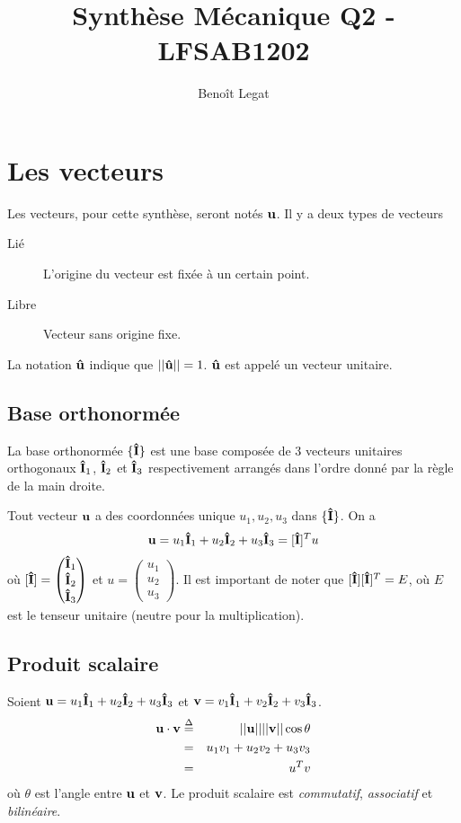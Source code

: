 \documentclass[11pt,a4paper]{article}
\title{Synthèse Mécanique Q2 - LFSAB1202}
\author{Benoît Legat}
\newcommand\fv[1]{{\bf #1}} %
\newcommand\uv[1]{{\bf\hat{ #1}}} %
\newcommand\ui{{\bf\hat{I}}} %
\newcommand\eqdef{\stackrel{\Delta}{=}}
\begin{document}
\maketitle
\section{Les vecteurs}

Les vecteurs, pour cette synthèse, seront notés $\fv{u}$.
Il y a deux types de vecteurs
\begin{description}
	\item[Lié] L'origine du vecteur est fixée à un certain point.
	\item[Libre] Vecteur sans origine fixe.
\end{description}
La notation $\uv{u}$ indique que $||\uv{u}|| = 1$.
$\uv{u}$ est appelé un vecteur unitaire.

\subsection{Base orthonormée}

La base orthonormée $\{\ui\}$ est une base composée de 3 vecteurs unitaires orthogonaux $\ui_1$, $\ui_2$ et $\ui_3$ respectivement arrangés dans l'ordre donné par la règle de la main droite.

Tout vecteur $\fv{u}$ a des coordonnées unique $u_1, u_2, u_3$ dans $\{\ui\}$.
On a
\[ \fv{u} = u_1\ui_1 + u_2\ui_2 + u_3\ui_3 = [\ui]^T u \]
	où $[\ui] = \begin{pmatrix}\ui_1\\\ui_2\\\ui_3\end{pmatrix}$ et $u = \begin{pmatrix} u_1 \\ u_2 \\ u_3 \end{pmatrix}$.
Il est important de noter que $[\ui][\ui]^T = E$, où $E$ est le tenseur unitaire (neutre pour la multiplication).

\subsection{Produit scalaire}

Soient $\fv{u} = u_1\ui_1 + u_2\ui_2 + u_3\ui_3$ et $\fv{v} = v_1\ui_1 + v_2\ui_2 + v_3\ui_3$.
\begin{eqnarray*}
	\fv{u}\cdot\fv{v} & \eqdef & ||\fv{u}|| ||\fv{v}|| \cos\theta\\
	& = & u_1v_1 + u_2v_2 + u_3v_3\\
	& = & u^T v
\end{eqnarray*}
où $\theta$ est l'angle entre $\fv{u}$ et $\fv{v}$.
Le produit scalaire est {\em commutatif}, {\em associatif} et {\em bilinéaire}.
\end{document}
